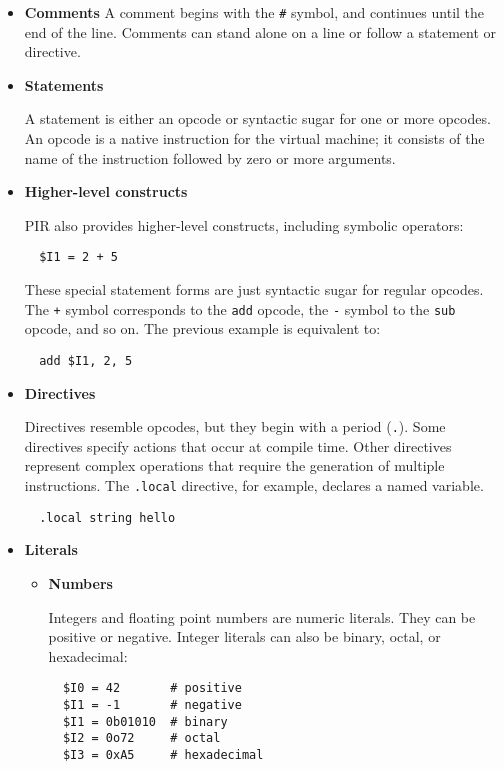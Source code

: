 \begin{itemize}
\item {\bf Comments }
A comment begins with the \verb|#| symbol, and continues until the end of
the line. Comments can stand alone on a line or follow a statement
or directive.

\item {\bf Statements }

A statement is either an opcode or syntactic sugar for one or more
opcodes. An opcode is a native instruction for the virtual machine;
it consists of the name of the instruction followed by zero or more
arguments.

\item {\bf Higher-level constructs }

PIR also provides higher-level constructs, including symbolic operators:

\begin{verbatim}
  $I1 = 2 + 5
\end{verbatim}

These special statement forms are just syntactic sugar for regular
opcodes. The \verb|+| symbol corresponds to the \verb|add| opcode, the 
\verb|-| symbol
to the \verb|sub| opcode, and so on. The previous example is equivalent
to:

\begin{verbatim}
  add $I1, 2, 5
\end{verbatim}

\item {\bf Directives }

Directives resemble opcodes, but they begin with a period (\verb|.|). Some
directives specify actions that occur at compile time. Other
directives represent complex operations that require the generation
of multiple instructions. The \verb|.local| directive, for example, declares
a named variable.

\begin{verbatim}
  .local string hello
\end{verbatim}

\item {\bf Literals }

\begin{itemize}
\item {\bf Numbers }

Integers and floating point numbers are numeric literals. They can be positive or negative.
Integer literals can also be binary, octal, or hexadecimal:

\begin{verbatim}
  $I0 = 42       # positive
  $I1 = -1       # negative
  $I1 = 0b01010  # binary
  $I2 = 0o72     # octal
  $I3 = 0xA5     # hexadecimal
\end{verbatim}


\end{itemize}
\end{itemize}
